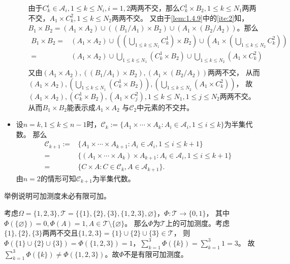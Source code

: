 \documentclass{ctexart}
\begin{document}
\begin{solution}
\begin{itemize}
\begin{itemize}
    由于\(C^i_k \in \mathcal{A}_i, 1 \leq k \leq N_i,i=1,2\)两两不交，那么\(C^1_k \times B_2, 1 \leq k \leq N_1\)两两不交，\(A_1 \times C^2_k,1 \leq k \leq N_2 \)两两不交。
    又由于\ref{lem:1.4.9}中的\ref{ite:2}知，
        \(B_1 \times B_2 = (A_1 \times A_2) \cup ((B_1 / A_1) \times B_2) \cup (A_1 \times (B_2 / A_2)) \)。那么
\[
 \begin{aligned}
   B_1 \times B_2 =& (A_1 \times A_2) \cup (( \bigcup_{1 \leq k \leq N_1} C^1_k )\times B_2 )\cup (A_1 \times (\bigcup_{1 \leq k \leq N_2} C^2_k))\\ 
   =&(A_1 \times A_2) \cup \bigcup_{1 \leq k \leq N_1} (C^1_k \times B_2) \cup \bigcup_{1 \leq k \leq N_2}(A_1 \times C^2_k)\\
 \end{aligned}
\]
又由\((A_1 \times A_2) , ((B_1 / A_1) \times B_2) , (A_1 \times (B_2 / A_2)) \)两两不交，
        从而\((A_1 \times A_2) , (\bigcup_{1 \leq k \leq N_1} (C^1_k \times B_2) ), ( \bigcup_{1 \leq k \leq N_2} (A_1 \times C^2_k)) \)，
        故\((A_1 \times A_2) , (C^1_k \times B_2 ), (A_1 \times C^2_j), 1 \leq  k \leq N_1, 1 \leq j \leq N_2 \)两两不交。
        从而\(B_1 \times B_2 \)能表示成\(A_1 \times A_2 \) 与\(\mathcal{C}_2 \)中元素的不交并。
    \end{itemize}
  \item 设\(n=k, 1 \leq k \leq n-1\)时，\(\mathcal{C}_k:=\{A_1 \times \cdots \times A_k:A_i \in \mathcal{A}_i, 1 \leq i \leq k\} \)为半集代数。
    那么\[
      \begin{aligned}
        \mathcal{C}_{k + 1}:=&\{A_1 \times \cdots \times A_{k + 1}: A_i \in \mathcal{A}_i, 1 \leq i \leq k + 1\}\\
        =&\{(A_1 \times \cdots \times A_k)\times A_{k + 1}: A_i \in \mathcal{A}_i, 1 \leq i \leq k + 1\} \\ 
        =&\{C \times A: C \in \mathcal{C}_k ,A \in \mathcal{A}_{k + 1}\}.
      \end{aligned}
    \]
    由\(n=2 \)的情形可知\(\mathcal{C}_{k + 1} \)为半集代数。
\end{itemize}
\end{solution}

\begin{problem}\label{pro:1.4.11}
  举例说明可加测度未必有限可加。
\end{problem}
\begin{solution}
考虑\(\Omega=\{1,2,3\},\mathcal{T}=\{\{1\},\{2\},\{3\},\{1,2,3\},\varnothing \} \)，\(\Phi:\mathcal{T} \to \{0,1\} \)，
其中\(\Phi(\{\varnothing\})=0,\Phi(A)=1,A \in \mathcal{T}\setminus\{\varnothing\} \)。
那么\(\Phi \)为\(\mathcal{T} \)上的可加测度。考虑\(\{1\},\{2\},\{3\} \)两两不交且\(\{1,2,3\}=\{1\} \cup \{2\}\cup \{3\} \in \mathcal{T} \)，
则\(\Phi(\{1\} \cup \{2\} \cup \{3\})=\Phi(\{1,2,3\})=1\)，\(\sum_{k=1}^{3}\Phi(\{k\})=\sum_{k=1}^{3}1=3 \)。
故\(\sum_{k=1}^{3}\Phi(\{k\}) \neq \Phi(\{1,2,3\}) \)。故\(\Phi \)不是有限可加测度。
\end{solution}
\end{document}
